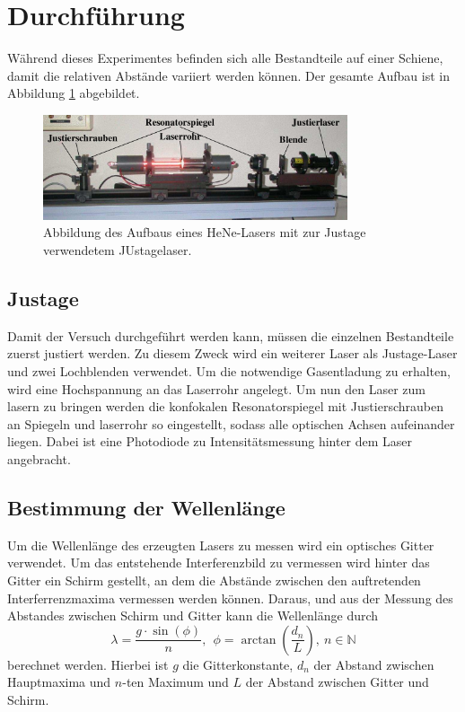 \newpage
\section{Durchführung}
\label{sec:Durchführung}
Während dieses Experimentes befinden sich alle Bestandteile auf einer Schiene,
damit die relativen Abstände variiert werden können. Der gesamte Aufbau ist in
Abbildung \ref{fig:Versuchsaufbau1} abgebildet.
\begin{figure}[htb]
  \centering
  \includegraphics[width=0.8\textwidth]{content/aufbau.png}
  \caption{Abbildung des Aufbaus eines HeNe-Lasers mit zur Justage verwendetem JUstagelaser.}
  \label{fig:Versuchsaufbau1}
\end{figure}
\FloatBarrier

\subsection{Justage}

Damit der Versuch durchgeführt
werden kann, müssen die einzelnen Bestandteile zuerst justiert werden. Zu diesem
Zweck wird ein weiterer Laser als Justage-Laser und zwei Lochblenden verwendet.
Um die notwendige Gasentladung zu erhalten, wird eine Hochspannung an das Laserrohr
angelegt. Um nun den Laser zum lasern zu bringen werden die konfokalen
Resonatorspiegel mit Justierschrauben  an Spiegeln und laserrohr so eingestellt,
sodass alle optischen Achsen aufeinander liegen. Dabei ist eine Photodiode zu
Intensitätsmessung hinter dem Laser angebracht.

\subsection{Bestimmung der Wellenlänge}
Um die Wellenlänge
des erzeugten Lasers zu messen wird ein optisches Gitter verwendet.
Um das entstehende Interferenzbild zu vermessen wird hinter das Gitter ein Schirm
gestellt, an dem die Abstände zwischen den auftretenden Interferrenzmaxima vermessen
werden können. Daraus, und aus der Messung des Abstandes zwischen Schirm und Gitter
kann die Wellenlänge durch
\begin{equation}
  \lambda = \frac{g\cdot\sin(\phi)}{n},\ \ \phi = \arctan\left(\frac{d_n}{L}\right),\  n\in\mathds{N}
  \label{eqn:welle}
\end{equation}
berechnet werden. Hierbei ist $g$ die Gitterkonstante, $d_n$ der Abstand zwischen Hauptmaxima
und $n$-ten Maximum und $L$ der Abstand zwischen Gitter und Schirm.

